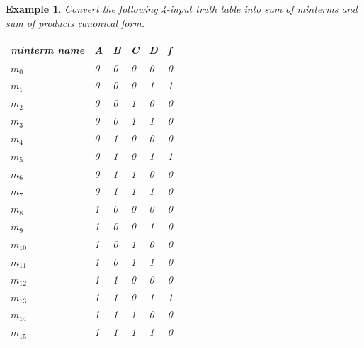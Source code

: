 \documentclass{article}
\newtheorem{example}{Example}
\begin{document}
\begin{example}
  Convert the following 4-input truth table into sum of minterms and sum of products canonical form.

  \noindent \begin{tabular}{p{20mm}llll|l}
    \toprule
    minterm name & A & B & C & D & f \\
    \midrule
    $m_0$ & 0 & 0 & 0 & 0 & 0 \\ 
    $m_1$ & 0 & 0 & 0 & 1 & 1 \\ 
    $m_2$ & 0 & 0 & 1 & 0 & 0 \\ 
    $m_3$ & 0 & 0 & 1 & 1 & 0 \\ 
    $m_4$ & 0 & 1 & 0 & 0 & 0 \\ 
    $m_5$ & 0 & 1 & 0 & 1 & 1 \\ 
    $m_6$ & 0 & 1 & 1 & 0 & 0 \\ 
    $m_7$ & 0 & 1 & 1 & 1 & 0 \\ 
    $m_8$ & 1 & 0 & 0 & 0 & 0 \\ 
    $m_9$ & 1 & 0 & 0 & 1 & 0 \\ 
    $m_{10}$ & 1 & 0 & 1 & 0 & 0 \\
    $m_{11}$ & 1 & 0 & 1 & 1 & 0 \\
    $m_{12}$ & 1 & 1 & 0 & 0 & 0 \\
    $m_{13}$ & 1 & 1 & 0 & 1 & 1 \\
    $m_{14}$ & 1 & 1 & 1 & 0 & 0 \\
    $m_{15}$ & 1 & 1 & 1 & 1 & 0 \\
    \bottomrule
  \end{tabular}
\end{example}
\end{document}
